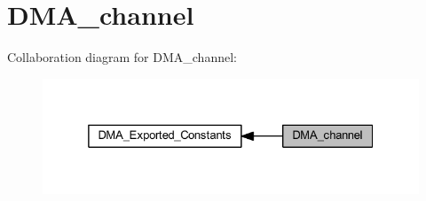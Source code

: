 \hypertarget{group___d_m_a__channel}{}\section{D\+M\+A\+\_\+channel}
\label{group___d_m_a__channel}
Collaboration diagram for D\+M\+A\+\_\+channel\+:
\nopagebreak
\begin{figure}[H]
\begin{center}
\leavevmode
\includegraphics[width=325pt]{group___d_m_a__channel}
\end{center}
\end{figure}
